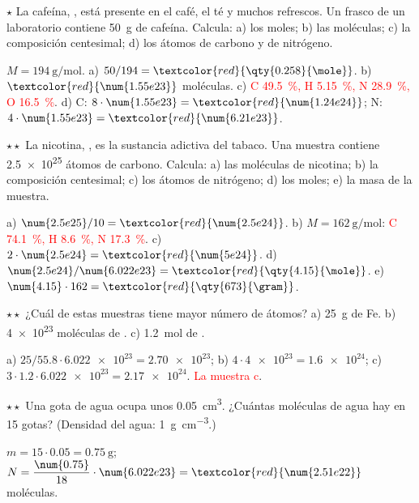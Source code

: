 \begin{exercise}
    \(\star\) La cafeína, , está presente en el café, el té y muchos refrescos. Un frasco de un laboratorio
    contiene \qty{50}{\gram} de cafeína. Calcula: a) los moles; b) las moléculas; c) la composición centesimal; d) los átomos de
    carbono y de nitrógeno.
    \begin{solu}
        \(M = \qty{194}{\gram\per\mole}\). a) \(50/194 = \textcolor{red}{\qty{0.258}{\mole}}\). b) \(\textcolor{red}{\num{1.55e23}}\) moléculas.
        c) \textcolor{red}{C \qty{49.5}{\percent}, H \qty{5.15}{\percent}, N \qty{28.9}{\percent}, O \qty{16.5}{\percent}}.
        d) C: \(8 \cdot \num{1.55e23} = \textcolor{red}{\num{1.24e24}}\); N: \(4 \cdot \num{1.55e23} = \textcolor{red}{\num{6.21e23}}\).
    \end{solu}
\end{exercise}

\begin{exercise}
    \(\star\star\) La nicotina, , es la sustancia adictiva del tabaco. Una muestra contiene \num{2.5e25} átomos de
    carbono. Calcula: a) las moléculas de nicotina; b) la composición centesimal; c) los átomos de nitrógeno; d) los moles;
    e) la masa de la muestra.
    \begin{solu}
        a) \(\num{2.5e25}/10 = \textcolor{red}{\num{2.5e24}}\). b) \(M = \qty{162}{\gram\per\mole}\): \textcolor{red}{C \qty{74.1}{\percent}, H \qty{8.6}{\percent},
        N \qty{17.3}{\percent}}. c) \(2 \cdot \num{2.5e24} = \textcolor{red}{\num{5e24}}\). d) \(\num{2.5e24}/\num{6.022e23} = \textcolor{red}{\qty{4.15}{\mole}}\).
        e) \(\num{4.15} \cdot 162 = \textcolor{red}{\qty{673}{\gram}}\).
    \end{solu}
\end{exercise}

\begin{exercise}
    \(\star\star\) ¿Cuál de estas muestras tiene mayor número de átomos? a) \qty{25}{\gram} de Fe. b) \num{4e23} moléculas de
    . c) \qty{1.2}{\mole} de .
    \begin{solu}
        a) \(25/\num{55.8} \cdot \num{6.022e23} = \num{2.70e23}\); b) \(4 \cdot \num{4e23} = \num{1.6e24}\);
        c) \(3 \cdot \num{1.2} \cdot \num{6.022e23} = \num{2.17e24}\). \textcolor{red}{La muestra c}.
    \end{solu}
\end{exercise}

\begin{exercise}
    \(\star\star\) Una gota de agua ocupa unos \qty{0.05}{\cubic\centi\metre}. ¿Cuántas moléculas de agua hay en 15 gotas? (Densidad
    del agua: \qty{1}{\gram\per\cubic\centi\metre}.)
    \begin{solu}
        \(m = 15 \cdot \num{0.05} = \qty{0.75}{\gram}\); \(N = \dfrac{\num{0.75}}{18} \cdot \num{6.022e23} = \textcolor{red}{\num{2.51e22}}\) moléculas.
    \end{solu}
\end{exercise}

